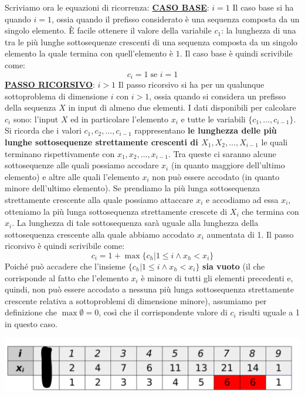 \documentclass[12pt]{article}
\begin{document}
Scriviamo ora le equazioni di ricorrenza: \newline
\textbf{\underline{CASO BASE}}: $i = 1$ \newline
Il caso base si ha quando $i = 1$, ossia quando il prefisso considerato è una sequenza composta da un singolo elemento.
È facile ottenere il valore della variabile $c_1$: la lunghezza di una tra le più lunghe sottosequenze crescenti di una sequenza composta da un singolo elemento la quale termina con quell'elemento è $1$. Il caso base è quindi scrivibile come:
$$c_i = 1 \; \textrm{se } i = 1$$
\textbf{\underline{PASSO RICORSIVO}}: $i > 1$ \newline
Il passo ricorsivo si ha per un qualunque sottoproblema di dimensione $i$ con $i >1$, ossia quando si considera un prefisso della sequenza $X$ in input di almeno due elementi.
I dati disponibili per calcolare $c_i$ sono: l'input $X$ ed in particolare l'elemento $x_i$ e tutte le variabili $\{c_1,\dots,c_{i-1}\}$. Si ricorda che i valori $c_1,c_2,\dots,c_{i-1}$ rappresentano
\textbf{le lunghezza delle più lunghe sottosequenze strettamente crescenti di $X_1, X_2, \dots, X_{i-1}$} le quali terminano rispettivamente con $x_1, x_2, \dots, x_{i-1}$.
Tra queste ci saranno alcune sottosequenze alle quali possiamo accodare $x_i$ (in quanto maggiore dell'ultimo elemento) e altre alle quali l'elemento $x_i$ non può essere accodato (in quanto minore dell'ultimo elemento).
Se prendiamo la più lunga sottosequenza strettamente crescente alla quale possiamo attaccare $x_i$ e accodiamo ad essa $x_i$, otteniamo la più lunga sottosequenza strettamente crescete di $X_i$ che termina con $x_i$.
La lunghezza di tale sottosequenza sarà uguale alla lunghezza della sottosequenza crescente alla quale abbiamo accodato $x_i$ aumentata di 1. Il passo ricorsivo è quindi scrivibile come:
$$c_i = 1 + \max\{c_h|1 \leq i \land x_h < x_i \}$$
Poiché può accadere che l'insieme $\{c_h|1 \leq i \land x_h < x_i \}$ \textbf{sia vuoto} (il che corrisponde al fatto che l'elemento $x_i$ è minore di tutti gli elementi precedenti e, quindi, non può essere accodato a nessuna più lunga sottosequenza strettamente crescente relativa a sottoproblemi di dimensione minore),
assumiamo per definizione che $\max \emptyset = 0$, così che il corrispondente valore di $c_i$ risulti uguale a 1 in questo caso.
\begin{center}
    \includegraphics[width = 0.60\linewidth]{Images/8.png}
\end{center}
\end{document}
